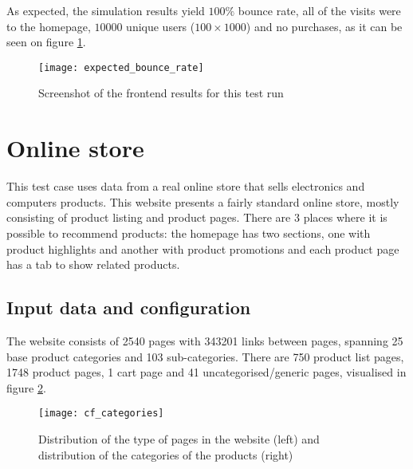 As expected, the simulation results yield $100\%$ bounce rate, all of the 
visits were to the homepage, $10000$ unique users ($100 \times 1000$) and no 
purchases, as it can be seen on figure \ref{fig:test3result}.

\begin{figure}[h]
    \begin{center}
        \leavevmode
        \texttt{[image: expected\_bounce\_rate]}
        \caption{Screenshot of the frontend results for this test run}
        \label{fig:test3result}
    \end{center}
\end{figure}


\section{Online store}

This test case uses data from a real online store that sells electronics and 
computers products. This website presents a fairly standard online store, 
mostly consisting of product listing and product pages. There are 3 places 
where it is possible to recommend products: the homepage has two sections, one 
with product highlights and another with product promotions and each product 
page has a tab to show related products.

\subsection{Input data and configuration}

The website consists of 2540 pages with 343201 links between pages, spanning 25 
base product categories and 103 sub-categories. There are 750 product list 
pages, 1748 product pages, 1 cart page and 41 uncategorised/generic pages, 
visualised in figure \ref{fig:cfcategories}.

\begin{figure}[h]
    \begin{center}
        \leavevmode
        \texttt{[image: cf\_categories]}
        \caption{Distribution of the type of pages in the website (left) and 
        distribution of the categories of the products (right)}
        \label{fig:cfcategories}
    \end{center}
\end{figure}

